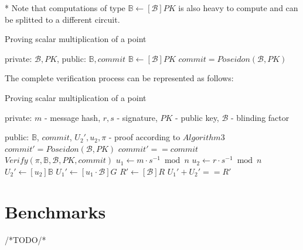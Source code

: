 \documentclass{iacrtrans}
\begin{document}
* Note that computations of type $\mathbb{B} \gets [\mathcal{B}]PK$ is also heavy to compute and can be splitted to a different circuit.

\begin{algorithm}[H]
  \caption{Proving scalar multiplication of a point}
  \begin{algorithmic}[1]
  \Require private: $\mathcal{B}, PK$, public: $\mathbb{B}, commit$
  \State $\mathbb{B} \gets [\mathcal{B}]PK$
  \State $commit = Poseidon(\mathcal{B}, PK)$
  \end{algorithmic}
\end{algorithm}

The complete verification process can be represented as follows:

\begin{algorithm}[H]
  \caption{Proving scalar multiplication of a point}
  \begin{algorithmic}[1]
  \Require private: $m$ - message hash, $r,s$ - signature, $PK$ - public key, $\mathcal{B}$ - blinding factor

  public: $\mathbb{B}$, $commit$, $U_2', u_2,
  \pi$ - proof according to $Algorithm 3$
  \State $commit' = Poseidon(\mathcal{B}, PK)$
  \State $commit' == commit$
  \State $Verify(\pi, \mathbb{B}, \mathcal{B}, PK, commit)$ 
  \State $u_1 \gets m \cdot s^{-1} \bmod n$
  \State $u_2 \gets r \cdot s^{-1} \bmod n$
  \State $U_2' \gets [u_2]\mathbb{B}$  
  \State $U_1' \gets [u_1 \cdot \mathcal{B}]G$
  \State $R' \gets [\mathcal{B}]R$
  \State $U_1' + U_2' == R'$
  \end{algorithmic}
\end{algorithm}


\section{Benchmarks}
/*TODO/*
\end{document}

